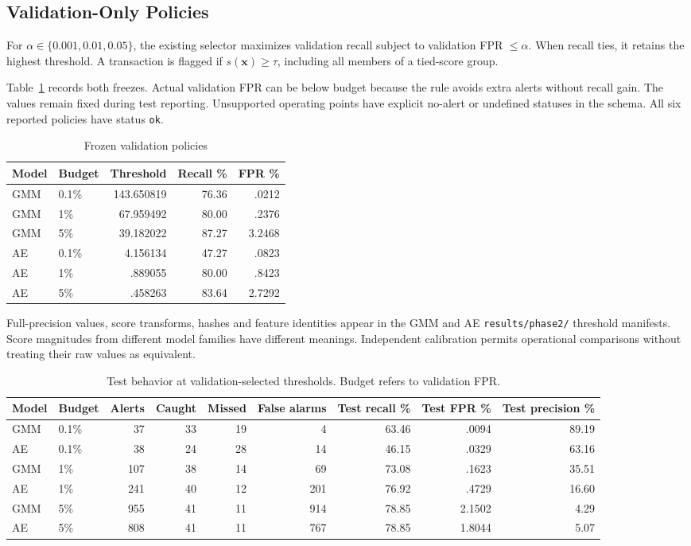\documentclass[conference]{IEEEtran}
\newcommand{\artifact}[1]{{\footnotesize\nolinkurl{#1}}}
\begin{document}
\subsection{Validation-Only Policies}
For $\alpha\in\{0.001,0.01,0.05\}$, the existing selector maximizes validation recall subject to validation FPR $\leq\alpha$. When recall ties, it retains the highest threshold. A transaction is flagged if $s(\mathbf{x})\geq\tau$, including all members of a tied-score group.

Table~\ref{tab:freeze} records both freezes. Actual validation FPR can be below budget because the rule avoids extra alerts without recall gain. The values remain fixed during test reporting. Unsupported operating points have explicit no-alert or undefined statuses in the schema. All six reported policies have status \texttt{ok}.

\begin{table}[!ht]
\caption{Frozen validation policies}\label{tab:freeze}
\centering\small
\begin{tabular}{llrrr}\toprule
Model & Budget & Threshold & Recall \% & FPR \%\\\midrule
GMM & 0.1\% & 143.650819 & 76.36 & .0212\\
GMM & 1\% & 67.959492 & 80.00 & .2376\\
GMM & 5\% & 39.182022 & 87.27 & 3.2468\\
AE & 0.1\% & 4.156134 & 47.27 & .0823\\
AE & 1\% & .889055 & 80.00 & .8423\\
AE & 5\% & .458263 & 83.64 & 2.7292\\\bottomrule
\end{tabular}
\end{table}

Full-precision values, score transforms, hashes and feature identities appear in the GMM and AE \artifact{results/phase2/} threshold manifests. Score magnitudes from different model families have different meanings. Independent calibration permits operational comparisons without treating their raw values as equivalent.

\begin{table}[t]
\caption{Test behavior at validation-selected thresholds. Budget refers to validation FPR.}
\label{tab:testpolicy}\centering\small
\begin{tabular}{llrrrrrrr}\toprule
Model & Budget & Alerts & Caught & Missed & False alarms & Test recall \% & Test FPR \% & Test precision \%\\\midrule
GMM & 0.1\% & 37 & 33 & 19 & 4 & 63.46 & .0094 & 89.19\\
AE & 0.1\% & 38 & 24 & 28 & 14 & 46.15 & .0329 & 63.16\\
GMM & 1\% & 107 & 38 & 14 & 69 & 73.08 & .1623 & 35.51\\
AE & 1\% & 241 & 40 & 12 & 201 & 76.92 & .4729 & 16.60\\
GMM & 5\% & 955 & 41 & 11 & 914 & 78.85 & 2.1502 & 4.29\\
AE & 5\% & 808 & 41 & 11 & 767 & 78.85 & 1.8044 & 5.07\\\bottomrule
\end{tabular}
\end{table}
\end{document}
